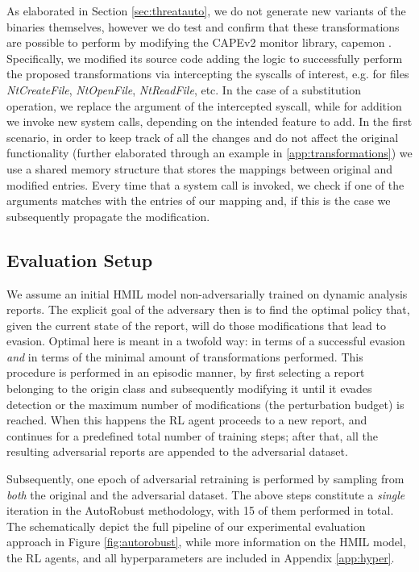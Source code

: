 As elaborated in Section \ref{sec:threatauto}, we do not generate new variants of the binaries themselves, however we do test and confirm that these transformations are possible to perform by modifying the CAPEv2 monitor library, capemon \cite{capemon}.
Specifically, we modified its source code adding the logic to successfully perform the proposed transformations via intercepting the syscalls of interest, e.g. for files \textit{NtCreateFile}, \textit{NtOpenFile}, \textit{NtReadFile}, etc.
In the case of a substitution operation, we replace the argument of the intercepted syscall, while for addition we invoke new system calls, depending on the intended feature to add.
In the first scenario, in order to keep track of all the changes and do not affect the original functionality (further elaborated through an example in \autoref{app:transformations}) we use a shared memory structure that stores the mappings between original and modified entries.
Every time that a system call is invoked, we check if one of the arguments matches with the entries of our mapping and, if this is the case we subsequently propagate the modification.

\subsection{Evaluation Setup}
We assume an initial \gls{HMIL} model non-adversarially trained on dynamic analysis reports.
The explicit goal of the adversary then is to find the optimal policy that, given the current state of the report, will do those modifications that lead to evasion.
Optimal here is meant in a twofold way: in terms of a successful evasion \textit{and} in terms of the minimal amount of transformations performed.
This procedure is performed in an episodic manner, by first selecting a report belonging to the origin class and subsequently modifying it until it evades detection or the maximum number of modifications (the perturbation budget) is reached.
When this happens the \gls{RL} agent proceeds to a new report, and continues for a predefined total number of training steps; after that, all the resulting adversarial reports are appended to the adversarial dataset.

Subsequently, one epoch of adversarial retraining is performed by sampling from \textit{both} the original and the adversarial dataset.
The above steps constitute a \textit{single} iteration in the AutoRobust methodology, with 15 of them performed in total.
The schematically depict the full pipeline of our experimental evaluation approach in Figure \ref{fig:autorobust}, while more information on the HMIL model, the RL agents, and all hyperparameters are included in Appendix \ref{app:hyper}.

